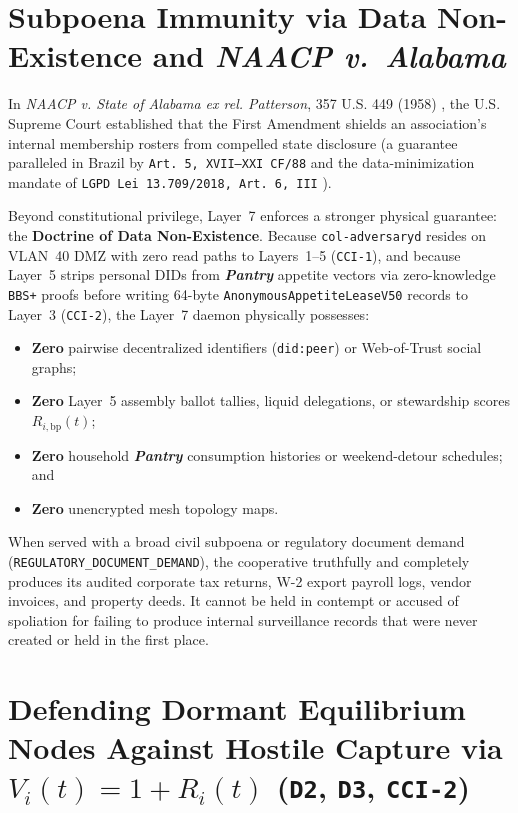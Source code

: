 \section{Subpoena Immunity via Data Non-Existence and \textit{NAACP v.\ Alabama}}
\label{sec:l7-data-nonexistence}

In \textit{NAACP v. State of Alabama ex rel. Patterson}, 357 U.S. 449 (1958) \parencite{naacp1958}, the U.S. Supreme Court established that the First Amendment shields an association's internal membership rosters from compelled state disclosure (a guarantee paralleled in Brazil by \texttt{Art.~5{\textordmasculine}, XVII--XXI CF/88} and the data-minimization mandate of \texttt{LGPD Lei 13.709/2018, Art.~6{\textordmasculine}, III} \parencite{brazil_cf88,brazil_lgpd2018}).

Beyond constitutional privilege, Layer~7 enforces a stronger physical guarantee: the \textbf{Doctrine of Data Non-Existence}. Because \texttt{col-adversaryd} resides on VLAN~40 DMZ with zero read paths to Layers~1--5 (\texttt{CCI-1}), and because Layer~5 strips personal DIDs from \textbf{\textit{Pantry}} appetite vectors via zero-knowledge \texttt{BBS+} proofs before writing 64-byte \texttt{AnonymousAppetiteLeaseV50} records to Layer~3 (\texttt{CCI-2}), the Layer~7 daemon physically possesses:
\begin{itemize}
    \item \textbf{Zero} pairwise decentralized identifiers (\texttt{did:peer}) or Web-of-Trust social graphs;
    \item \textbf{Zero} Layer~5 assembly ballot tallies, liquid delegations, or stewardship scores $R_{i,\mathrm{bp}}(t)$;
    \item \textbf{Zero} household \textbf{\textit{Pantry}} consumption histories or weekend-detour schedules; and
    \item \textbf{Zero} unencrypted mesh topology maps.
\end{itemize}
When served with a broad civil subpoena or regulatory document demand (\texttt{REGULATORY\_DOCUMENT\_DEMAND}), the cooperative truthfully and completely produces its audited corporate tax returns, W-2 export payroll logs, vendor invoices, and property deeds. It cannot be held in contempt or accused of spoliation for failing to produce internal surveillance records that were never created or held in the first place.

\section{Defending Dormant Equilibrium Nodes Against Hostile Capture via $V_i(t) = 1 + R_i(t)$ (\texttt{D2}, \texttt{D3}, \texttt{CCI-2})}
\label{sec:l7-dormant-capture-defense}

